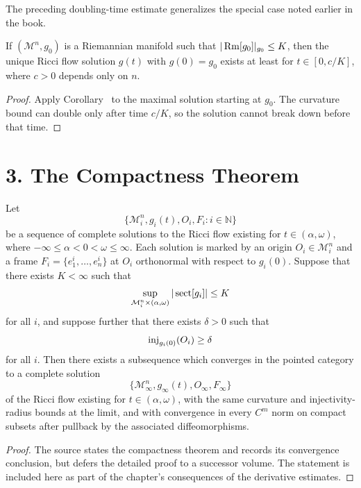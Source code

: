 \begin{remark}
\label{ch07-rem-special-case-doubling-time}
The preceding doubling-time estimate generalizes the special case noted earlier in the book.
\end{remark}

\begin{corollary}
\label{ch07-cor-minimal-existence-time}
If \((\mathcal M^n,g_0)\) is a Riemannian manifold such that \(|\operatorname{Rm}[g_0]|_{g_0}\le K\), then the unique Ricci flow solution \(g(t)\) with \(g(0)=g_0\) exists at least for \(t\in[0,c/K]\), where \(c>0\) depends only on \(n\).
\end{corollary}

\begin{proof}
Apply Corollary~ to the maximal solution starting at \(g_0\). The curvature bound can double only after time \(c/K\), so the solution cannot break down before that time.
\end{proof}

\section*{3. The Compactness Theorem}

\begin{theorem}
\label{ch07-thm-compactness-theorem}
Let
\[
\{\mathcal M_i^n,g_i(t),O_i,F_i:i\in\mathbb N\}
\]
be a sequence of complete solutions to the Ricci flow existing for \(t\in(\alpha,\omega)\), where \(-\infty\le \alpha<0<\omega\le\infty\). Each solution is marked by an origin \(O_i\in \mathcal M_i^n\) and a frame \(F_i=\{e_1^i,\dots,e_n^i\}\) at \(O_i\) orthonormal with respect to \(g_i(0)\). Suppose that there exists \(K<\infty\) such that
\[
\sup_{\mathcal M_i^n\times(\alpha,\omega)}|\operatorname{sect}[g_i]|\le K
\]
for all \(i\), and suppose further that there exists \(\delta>0\) such that
\[
\operatorname{inj}_{g_i(0)}(O_i)\ge \delta
\]
for all \(i\). Then there exists a subsequence which converges in the pointed category to a complete solution
\[
\{\mathcal M_\infty^n,g_\infty(t),O_\infty,F_\infty\}
\]
of the Ricci flow existing for \(t\in(\alpha,\omega)\), with the same curvature and injectivity-radius bounds at the limit, and with convergence in every \(C^m\) norm on compact subsets after pullback by the associated diffeomorphisms.
\end{theorem}

\begin{proof}
The source states the compactness theorem and records its convergence conclusion, but defers the detailed proof to a successor volume. The statement is included here as part of the chapter's consequences of the derivative estimates.
\end{proof}
